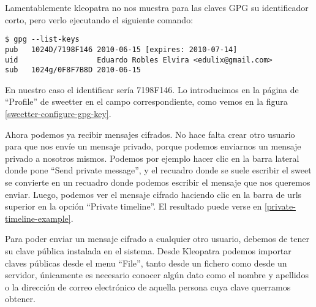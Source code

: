 Lamentablemente kleopatra no nos muestra para las claves GPG su identificador corto, pero verlo ejecutando el siguiente comando:

\begin{verbatim}
$ gpg --list-keys
pub   1024D/7198F146 2010-06-15 [expires: 2010-07-14]
uid                  Eduardo Robles Elvira <edulix@gmail.com>
sub   1024g/0F8F7B8D 2010-06-15 
\end{verbatim}


En nuestro caso el identificar sería 7198F146. Lo introducimos en la página de ``Profile'' de sweetter en el campo correspondiente, como vemos en la figura \ref{sweetter-configure-gpg-key}. 

Ahora podemos ya recibir mensajes cifrados. No hace falta crear otro usuario para que nos envíe un mensaje privado, porque podemos enviarnos un mensaje privado a nosotros mismos. Podemos por ejemplo hacer clic en la barra lateral donde pone ``Send private message'', y el recuadro donde se suele escribir el sweet se convierte en un recuadro donde podemos escribir el mensaje que nos queremos enviar. Luego, podemos ver el mensaje cifrado haciendo clic en la barra de urls superior en la opción ``Private timeline''. El resultado puede verse en \ref{private-timeline-example}.


Para poder enviar un mensaje cifrado a cualquier otro usuario, debemos de tener su clave pública instalada en el sistema. Desde Kleopatra podemos importar claves públicas desde el menu ``File'', tanto desde un fichero como desde un servidor, únicamente es necesario conocer algún dato como el nombre y apellidos o la dirección de correo electrónico de aquella persona cuya clave querramos obtener.
